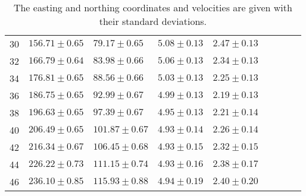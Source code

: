 \begin{table}[h]
\begin{center}
\begin{tabular}{lllllllll}
30 & $  156.71 \pm     0.65$ & $   79.17 \pm     0.65$ & $    5.08 \pm     0.13$ & $    2.47 \pm     0.13$  \\ 
32 & $  166.79 \pm     0.64$ & $   83.98 \pm     0.66$ & $    5.06 \pm     0.13$ & $    2.34 \pm     0.13$  \\ 
34 & $  176.81 \pm     0.65$ & $   88.56 \pm     0.66$ & $    5.03 \pm     0.13$ & $    2.25 \pm     0.13$  \\ 
36 & $  186.75 \pm     0.65$ & $   92.99 \pm     0.67$ & $    4.99 \pm     0.13$ & $    2.19 \pm     0.13$  \\ 
38 & $  196.63 \pm     0.65$ & $   97.39 \pm     0.67$ & $    4.95 \pm     0.13$ & $    2.21 \pm     0.14$  \\ 
40 & $  206.49 \pm     0.65$ & $  101.87 \pm     0.67$ & $    4.93 \pm     0.14$ & $    2.26 \pm     0.14$  \\ 
42 & $  216.34 \pm     0.67$ & $  106.45 \pm     0.68$ & $    4.93 \pm     0.15$ & $    2.32 \pm     0.15$  \\ 
44 & $  226.22 \pm     0.73$ & $  111.15 \pm     0.74$ & $    4.93 \pm     0.16$ & $    2.38 \pm     0.17$  \\ 
46 & $  236.10 \pm     0.85$ & $  115.93 \pm     0.88$ & $    4.94 \pm     0.19$ & $    2.40 \pm     0.20$  \\ \bottomrule 
      \end{tabular} 
   \end{center}
\caption{The easting and northing coordinates and velocities are given with their standard deviations.} 
\label{tab:tableSmoothed.tex} 
\end{table} 
